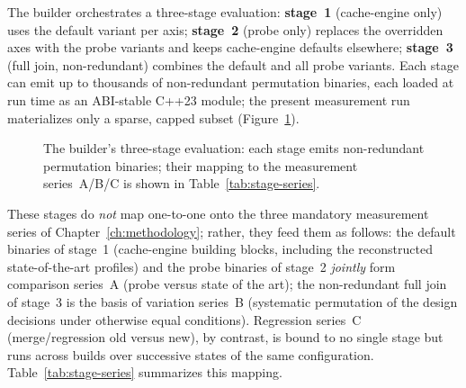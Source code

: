 The builder orchestrates a three-stage evaluation: \textbf{stage~1} (cache-engine only) uses the
default variant per axis; \textbf{stage~2} (probe only) replaces the overridden axes with the
probe variants and keeps cache-engine defaults elsewhere; \textbf{stage~3} (full join,
non-redundant) combines the default and all probe variants. Each stage can emit up to thousands of
non-redundant permutation binaries, each loaded at run time as an ABI-stable C++23 module; the present
measurement run materializes only a sparse, capped subset (Figure~\ref{fig:three-stage}).

\begin{figure}[!htbp]
  \centering
  \caption{The builder's three-stage evaluation: each stage emits non-redundant permutation
  binaries; their mapping to the measurement series~A/B/C is shown in
  Table~\ref{tab:stage-series}.}\label{fig:three-stage}
\end{figure}

These stages do \emph{not} map one-to-one onto the three mandatory measurement series of
Chapter~\ref{ch:methodology}; rather, they feed them as follows: the default binaries of stage~1
(cache-engine building blocks, including the reconstructed state-of-the-art profiles) and the probe
binaries of stage~2 \emph{jointly} form comparison series~A (probe versus state of the art); the
non-redundant full join of stage~3 is the basis of variation series~B (systematic permutation of the
design decisions under otherwise equal conditions). Regression series~C (merge/regression old versus
new), by contrast, is bound to no single stage but runs across builds over successive states of the
same configuration. Table~\ref{tab:stage-series} summarizes this mapping.

